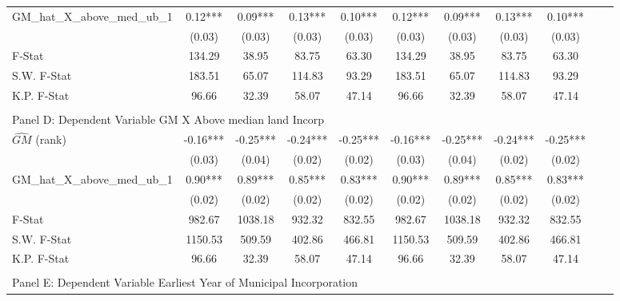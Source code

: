 \begin{table}[htbp]
\begin{threeparttable}
\begin{tabular}{l*{10}{c}}
\addlinespace
GM\_hat\_X\_above\_med\_ub\_1&       0.12***&       0.09***&       0.13***&       0.10***&       0.12***&       0.09***&       0.13***&       0.10***\\
                &     (0.03)   &     (0.03)   &     (0.03)   &     (0.03)   &     (0.03)   &     (0.03)   &     (0.03)   &     (0.03)   \\
\midrule
F-Stat          &     134.29   &      38.95   &      83.75   &      63.30   &     134.29   &      38.95   &      83.75   &      63.30   \\
S.W. F-Stat     &     183.51   &      65.07   &     114.83   &      93.29   &     183.51   &      65.07   &     114.83   &      93.29   \\
K.P. F-Stat     &      96.66   &      32.39   &      58.07   &      47.14   &      96.66   &      32.39   &      58.07   &      47.14   \\
\cmidrule[\heavyrulewidth](lr){1-9} \\ \cmidrule[\heavyrulewidth](lr){1-9}
\multicolumn{8}{l}{Panel D: Dependent Variable GM X Above median land Incorp}\\
\cmidrule(lr){1-9}
$\hat{GM}$ (rank)&      -0.16***&      -0.25***&      -0.24***&      -0.25***&      -0.16***&      -0.25***&      -0.24***&      -0.25***\\
                &     (0.03)   &     (0.04)   &     (0.02)   &     (0.02)   &     (0.03)   &     (0.04)   &     (0.02)   &     (0.02)   \\
\addlinespace
GM\_hat\_X\_above\_med\_ub\_1&       0.90***&       0.89***&       0.85***&       0.83***&       0.90***&       0.89***&       0.85***&       0.83***\\
                &     (0.02)   &     (0.02)   &     (0.02)   &     (0.02)   &     (0.02)   &     (0.02)   &     (0.02)   &     (0.02)   \\
\midrule
F-Stat          &     982.67   &    1038.18   &     932.32   &     832.55   &     982.67   &    1038.18   &     932.32   &     832.55   \\
S.W. F-Stat     &    1150.53   &     509.59   &     402.86   &     466.81   &    1150.53   &     509.59   &     402.86   &     466.81   \\
K.P. F-Stat     &      96.66   &      32.39   &      58.07   &      47.14   &      96.66   &      32.39   &      58.07   &      47.14   \\
\cmidrule[\heavyrulewidth](lr){1-9} \\ \cmidrule[\heavyrulewidth](lr){1-9}
\multicolumn{8}{l}{Panel E: Dependent Variable Earliest Year of Municipal Incorporation}\\

\end{tabular}
\end{threeparttable}
\end{table}
